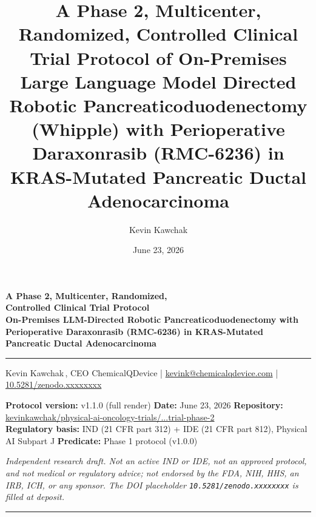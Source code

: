 \documentclass[11pt]{article}
\title{A Phase 2, Multicenter, Randomized, Controlled Clinical Trial Protocol of
On-Premises Large Language Model Directed Robotic Pancreaticoduodenectomy
(Whipple) with Perioperative Daraxonrasib (RMC-6236) in KRAS-Mutated Pancreatic
Ductal Adenocarcinoma}
\author{Kevin Kawchak}
\date{June 23, 2026}
\begin{document}
\thispagestyle{plain}

\begin{center}
{\LARGE\bfseries\color{accentcol} A Phase 2, Multicenter, Randomized,\\Controlled Clinical Trial Protocol}\\[0.4em]
{\large\bfseries On-Premises LLM-Directed Robotic Pancreaticoduodenectomy with Perioperative Daraxonrasib (RMC-6236) in KRAS-Mutated Pancreatic
Ductal Adenocarcinoma}\\[0.3em]
{\color{accentcol}\rule{\linewidth}{1.2pt}}
\end{center}

\begin{center}\small
Kevin Kawchak\,, CEO ChemicalQDevice \;|\;
\href{mailto:kevink@chemicalqdevice.com}{kevink@chemicalqdevice.com} \;|\;
\href{https://doi.org/10.5281/zenodo.xxxxxxxx}{10.5281/zenodo.xxxxxxxx}
\end{center}

\begin{center}\footnotesize
\textbf{Protocol version:} v1.1.0 (full render) \quad
\textbf{Date:} June 23, 2026 \quad \textbf{Repository:} \href{https://github.com/kevinkawchak/physical-ai-oncology-trials/tree/main/trial-phase-2}{kevinkawchak/physical-ai-oncology-trials/...trial-phase-2} \\
\textbf{Regulatory basis:} IND (21 CFR part 312) + IDE (21 CFR part 812),
Physical AI Subpart J \quad \textbf{Predicate:} Phase 1 protocol (v1.0.0)
\end{center}

\noindent\footnotesize\textit{Independent research draft. Not an active IND or
IDE, not an approved protocol, and not medical or regulatory advice; not endorsed
by the FDA, NIH, HHS, an IRB, ICH, or any sponsor. The DOI placeholder
\texttt{10.5281/zenodo.xxxxxxxx} is filled at deposit.}\normalsize\par

\renewcommand{\keywordname}{\textbf{Keywords}}

\vspace{0.4em}
{\color{accentcol}\rule{\linewidth}{0.6pt}}

\renewcommand{\contentsname}{\color{accentcol}Table of Contents}
{\setlength{\parskip}{0pt}\small\tableofcontents}
\bigskip














\end{document}
